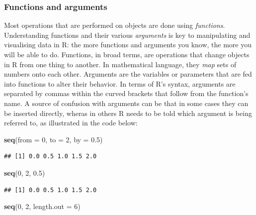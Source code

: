\documentclass[]{article}
\newenvironment{Shaded}{}{}
\newcommand{\KeywordTok}[1]{\textcolor[rgb]{0.00,0.44,0.13}{\textbf{{#1}}}}
\newcommand{\DataTypeTok}[1]{\textcolor[rgb]{0.56,0.13,0.00}{{#1}}}
\newcommand{\DecValTok}[1]{\textcolor[rgb]{0.25,0.63,0.44}{{#1}}}
\newcommand{\FloatTok}[1]{\textcolor[rgb]{0.25,0.63,0.44}{{#1}}}
\newcommand{\NormalTok}[1]{{#1}}
\begin{document}
\subsubsection{Functions and arguments}

Most operations that are performed on objects are done using
\emph{functions}. Understanding functions and their various
\emph{arguments} is key to manipulating and visualising data in R: the
more functions and arguments you know, the more you will be able to do.
Functions, in broad terms, are operations that change objects in R from
one thing to another. In mathematical language, they \emph{map} sets of
numbers onto each other. Arguments are the variables or parameters that
are fed into functions to alter their behavior. In terms of R's syntax,
arguments are separated by commas within the curved brackets that follow
from the function's name. A source of confusion with arguments can be
that in some cases they can be inserted directly, wheras in others R
needs to be told which argument is being referred to, as illustrated in
the code below:

\begin{Shaded}
\begin{Highlighting}[]
\KeywordTok{seq}\NormalTok{(}\DataTypeTok{from =} \DecValTok{0}\NormalTok{, }\DataTypeTok{to =} \DecValTok{2}\NormalTok{, }\DataTypeTok{by =} \FloatTok{0.5}\NormalTok{)}
\end{Highlighting}
\end{Shaded}

\begin{verbatim}
## [1] 0.0 0.5 1.0 1.5 2.0
\end{verbatim}

\begin{Shaded}
\begin{Highlighting}[]
\KeywordTok{seq}\NormalTok{(}\DecValTok{0}\NormalTok{, }\DecValTok{2}\NormalTok{, }\FloatTok{0.5}\NormalTok{)}
\end{Highlighting}
\end{Shaded}

\begin{verbatim}
## [1] 0.0 0.5 1.0 1.5 2.0
\end{verbatim}

\begin{Shaded}
\begin{Highlighting}[]

\KeywordTok{seq}\NormalTok{(}\DecValTok{0}\NormalTok{, }\DecValTok{2}\NormalTok{, }\DataTypeTok{length.out =} \DecValTok{6}\NormalTok{)}
\end{Highlighting}
\end{Shaded}
\end{document}
